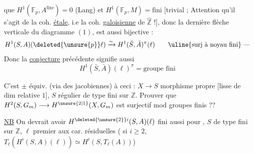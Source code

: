 que $H^1(\mathbb{F}_p,A^{\text{fixe}})=0$ (Lang) et %
$H^1(\mathbb{F}_p,M)=\text{fini}$ [trivial ; Attention qu'il s'agit %
de la coh. \uline{étale}, i.e la coh. \uline{galoisienne} de %
$\widehat{\mathbb{Z}}$ !], donc la dernière flèche verticale %
du diagramme $(1)$, est aussi bijective : %
\[
H^1(S,A)(\deleted{\unsure{p}}\ell)\xrightarrow{\sim}H^1(\bar S,\bar A)^\pi(\ell)
 \qquad\text{\uline{surj à noyau fini} ---} %
\]
Donc la \uline{conjecture} précédente signifie aussi %
\[
\boxed{H^1(\bar S,\bar A)(\ell)^\pi=\text{groupe fini}} %
\]


C'est  $\pm$ équiv. (via des jacobiennes) à %
ceci : $X\longrightarrow S$ morphisme propre [lisse %
de dim relative $1$], $S$ régulier de %
type fini sur $\mathbb{Z}$. Prouver que %
$H^2(S,G_m)\longrightarrow H^{\unsure{2|1}}(X,G_m)$ est surjectif mod %
groupes finis ?? %

\uline{NB} On devrait avoir $H^{\deleted{\unsure{2}}i}(S,A)(\ell)$ fini aussi %
pour , $S$ de type fini sur $\mathbb{Z}$, $\ell$ premier aux %
car. résiduelles  ( si $i\ge2$, $T_\ell(H^i(S,A)(\ell))\simeq H^i(S,T_\ell(A))$) %
